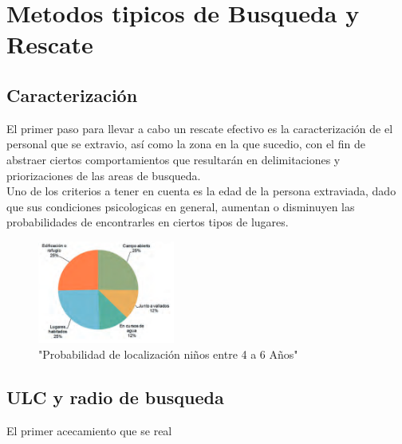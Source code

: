 \documentclass[11pt, twocolumn,letterpaper]{article}
\begin{document}
\section{Metodos tipicos de Busqueda y Rescate}
\subsection{Caracterización}
El primer paso para llevar a cabo un rescate efectivo es la caracterización de el personal que se extravio, así como la zona en la que sucedio, con el fin de abstraer ciertos comportamientos que resultarán en delimitaciones y priorizaciones de las areas de busqueda.\\

Uno de los criterios a tener en cuenta es la edad de la persona extraviada, dado que sus condiciones psicologicas en general, aumentan o disminuyen las probabilidades de encontrarles en ciertos tipos de lugares.\\

\begin{center}
\begin{figure}
\includegraphics[width=0.4\textwidth]{4a6}
\caption{"Probabilidad de localización niños entre 4 a 6 Años"}
\end{figure}
\end{center}

\subsection{ULC y radio de busqueda}
El primer acecamiento que se real
\end{document}
